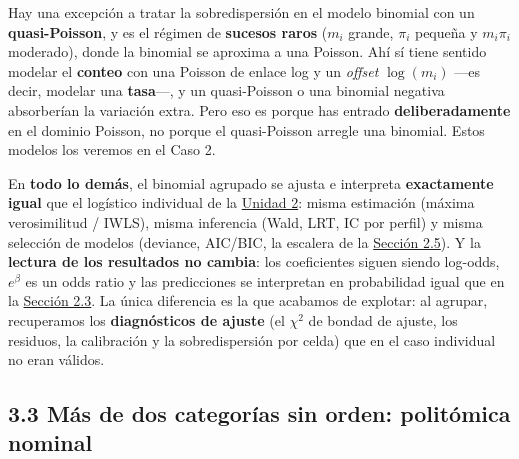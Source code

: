 \documentclass[
  letterpaper,
  DIV=11,
  numbers=noendperiod]{scrartcl}
\begin{document}
\begin{tcolorbox}[enhanced jigsaw, breakable, colframe=quarto-callout-note-color-frame, left=2mm, arc=.35mm, colbacktitle=quarto-callout-note-color!10!white, toprule=.15mm, colback=white, coltitle=black, rightrule=.15mm, opacitybacktitle=0.6, title=\textcolor{quarto-callout-note-color}{\faInfo}\hspace{0.5em}{¿Y tratar la sobredispersión binomial con quasi-Poisson?}, titlerule=0mm, toptitle=1mm, bottomtitle=1mm, leftrule=.75mm, bottomrule=.15mm, opacityback=0]

Hay una excepción a tratar la sobredispersión en el modelo binomial con
un \textbf{quasi-Poisson}, y es el régimen de \textbf{sucesos raros}
(\(m_i\) grande, \(\pi_i\) pequeña y \(m_i\pi_i\) moderado), donde la
binomial se aproxima a una Poisson. Ahí sí tiene sentido modelar el
\textbf{conteo} con una Poisson de enlace log y un \emph{offset}
\(\log(m_i)\) ---es decir, modelar una \textbf{tasa}---, y un
quasi-Poisson o una binomial negativa absorberían la variación extra.
Pero eso es porque has entrado \textbf{deliberadamente} en el dominio
Poisson, no porque el quasi-Poisson arregle una binomial. Estos modelos
los veremos en el Caso 2.

\end{tcolorbox}

En \textbf{todo lo demás}, el binomial agrupado se ajusta e interpreta
\textbf{exactamente igual} que el logístico individual de la
\protect\hyperlink{sec-u12}{Unidad 2}: misma estimación (máxima
verosimilitud / IWLS), misma inferencia (Wald, LRT, IC por perfil) y
misma selección de modelos (deviance, AIC/BIC, la escalera de la
\protect\hyperlink{sec-u12-inferencia}{Sección 2.5}). Y la
\textbf{lectura de los resultados no cambia}: los coeficientes siguen
siendo log-odds, \(e^{\beta}\) es un odds ratio y las predicciones se
interpretan en probabilidad igual que en la
\protect\hyperlink{sec-u12-interpretacion}{Sección 2.3}. La única
diferencia es la que acabamos de explotar: al agrupar, recuperamos los
\textbf{diagnósticos de ajuste} (el \(\chi^2\) de bondad de ajuste, los
residuos, la calibración y la sobredispersión por celda) que en el caso
individual no eran válidos.

\hypertarget{sec-u13-nominal}{%
\subsection{3.3 Más de dos categorías sin orden: politómica
nominal}\label{sec-u13-nominal}}
\end{document}

